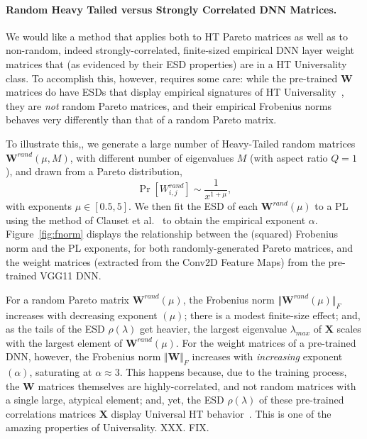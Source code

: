 \paragraph{Random Heavy Tailed versus Strongly Correlated DNN Matrices.} 

We would like a method that applies both to HT Pareto matrices as well as to non-random, indeed strongly-correlated, finite-sized empirical DNN layer weight matrices that (as evidenced by their ESD properties) are in a HT Universality class.  
To accomplish this, however, requires some care: while the pre-trained $\mathbf{W}$ matrices do have ESDs that display empirical signatures of HT Universality~\cite{MM18_TR}, they are \emph{not} random Pareto matrices, and their empirical Frobenius norms behaves very differently than that of a random Pareto matrix.  

To illustrate this,, we generate a large number of  Heavy-Tailed  random matrices $\mathbf{W}^{rand}(\mu,M)$, with different number of eigenvalues $M$ (with aspect ratio $Q=1$), and drawn from a Pareto distribution,
$$
\Pr[{W}^{rand}_{i,j}]\sim\dfrac{1}{x^{1+\mu}}  ,
$$
with exponents $\mu\in[0.5, 5]$.
%
We then fit the ESD of each $\mathbf{W}^{rand}(\mu)$ to a PL using the method of Clauset et al.~\cite{CSN09_powerlaw,ABP14} to obtain the empirical exponent $\alpha$.   Figure~\ref{fig:fnorm} displays the relationship between the (squared) Frobenius norm and the PL exponents, for both randomly-generated Pareto matrices, and the weight matrices
(extracted from the Conv2D Feature Maps) from the pre-trained VGG11 DNN.

For a random Pareto matrix $\mathbf{W}^{rand}(\mu)$, the Frobenius norm $\Vert\mathbf{W}^{rand}(\mu)\Vert_{F}$ increases with decreasing exponent $(\mu)$; there is a modest finite-size effect; and, as the tails of the ESD $\rho(\lambda)$ get heavier, the largest eigenvalue $\lambda_{max}$ of $\mathbf{X}$ scales with the largest element of $\mathbf{W}^{rand}(\mu)$. 
For the weight matrices of a pre-trained DNN, however, the Frobenius norm $\Vert\mathbf{W}\Vert_{F}$ increases with \emph{increasing} exponent $(\alpha)$, saturating at $\alpha\approx 3$.
This happens because, due to the training process, the $\mathbf{W}$ matrices themselves are highly-correlated, and not random matrices with a single large, atypical element;   
and, yet, the ESD $\rho(\lambda)$ of these pre-trained correlations matrices $\mathbf{X}$ display Universal HT behavior~\cite{MM18_TR}.
This is one of the amazing properties of Universality.
XXX.  FIX.

